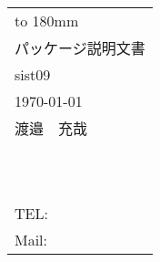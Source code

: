 ﻿\documentclass[uplatex]{jsarticle}
\renewcommand{\sistTitle}{sist09}%
\renewcommand{\Engtitle}{sist09}%
\renewcommand{\reportnumber}{}%
\renewcommand{\thesis}{パッケージ説明文書}%
\renewcommand{\edition}{(v1.0.0)}%
\renewcommand{\id}{}%
\renewcommand{\sistAuthor}{渡邉　充哉}%
\renewcommand{\Engauthor}{WATANABE Atsuya}%
\renewcommand{\freespace}{}
\renewcommand{\yearr}{2021}%
\renewcommand{\sistDate}{\today}%
\renewcommand{\organization}{~}
\renewcommand{\department}{~}%
\renewcommand{\Engdepartment}{}%
\renewcommand{\address}{}%
\renewcommand{\tel}{}%
\renewcommand{\mail}{}
\renewcommand{\editdata}{\sistDate}%
\begin{document}
\begin{table}[b]
\centering
\begin{tabular}{ll}
\vbox to 180mm{\vfill}	\\
\multicolumn{2}{l}{\small\thesis}	\\
\multicolumn{1}{l}{\Large\sistTitle}&	\\
\toprule
\editdata	\\
\sistAuthor\\
\organization	\\
\department	\\
\address	\\
TEL: \tel	\\ 
Mail: \mail	\\
\bottomrule
\end{tabular}
\end{table}
\renewcommand{\sistTitle}{sist09}%
\renewcommand{\Engtitle}{sist09}%
\renewcommand{\reportnumber}{}%
\renewcommand{\thesis}{スタイルファイル解説文書}%
\renewcommand{\edition}{v1.0.0}%
\renewcommand{\id}{}%
\renewcommand{\sistAuthor}{渡邉　充哉}%
\renewcommand{\Engauthor}{WATANABE Atsuya}%
\renewcommand{\freespace}{}
\renewcommand{\yearr}{2021}%
\renewcommand{\sistDate}{\today}%
\renewcommand{\organization}{~}
\renewcommand{\department}{~}%
\renewcommand{\Engdepartment}{}%
\renewcommand{\address}{}%
\renewcommand{\tel}{}%
\renewcommand{\mail}{}
\renewcommand{\editdata}{\sistDate}%

\end{document}
